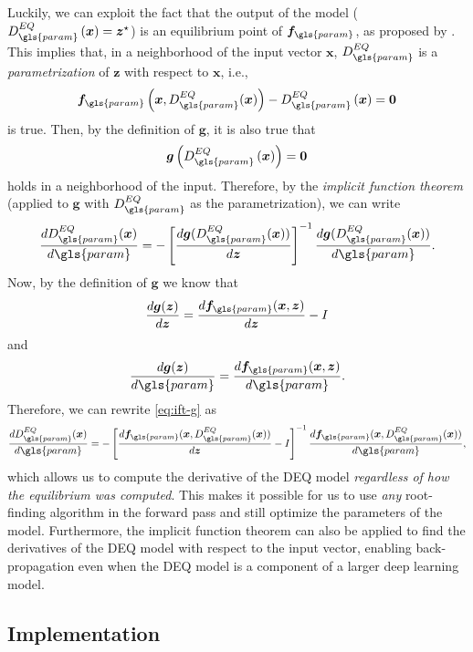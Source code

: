 Luckily, we can exploit the fact that the output of the model ($D^{EQ}_{\gls{param}}\left( \bm{x} \right) = \bm{z}^{\star}$) is an equilibrium point of $\bm{f}_{\gls{param}}$, as proposed by \textcite{Bai2019}.
This implies that, in a neighborhood of the input vector $\bm{x}$, $D^{EQ}_{\gls{param}}$ is a \emph{parametrization} of $\bm{z}$ with respect to $\bm{x}$, i.e., \[
    \bm{f}_{\gls{param}}\left( \bm{x},D^{EQ}_{\gls{param}}(\bm{x}) \right) -D^{EQ}_{\gls{param}}\left( \bm{x} \right) = \bm{0}
\] is true. Then, by the definition of $\bm{g}$, it is also true that \[
\bm{g}\left( D^{EQ}_{\gls{param}}\left( \bm{x} \right) \right) = \bm{0}
\] holds in a neighborhood of the input.
Therefore, by the \emph{implicit function theorem} (applied to $\bm{g}$ with $D^{EQ}_{\gls{param}}$ as the parametrization), we can write
\begin{equation}\label{eq:ift-g}
    \frac{d D^{EQ}_{\gls{param}}(\bm{x})}{d \gls{param}} = - \left[ \frac{d \bm{g}(D^{EQ}_{\gls{param}}(\bm{x}))}{d \bm{z}} \right]^{-1} \frac{d \bm{g}(D^{EQ}_{\gls{param}}(\bm{x}))}{d \gls{param}}
.\end{equation}
Now, by the definition of $\bm{g}$ we know that \[
    \frac{d \bm{g}(\bm{z})}{d \bm{z}} = \frac{d \bm{f}_{\gls{param}}(\bm{x},\bm{z})}{d \bm{z}} - I 
\] and \[
\frac{d \bm{g}(\bm{z})}{d \gls{param}} = \frac{d \bm{f}_{\gls{param}}(\bm{x},\bm{z})}{d \gls{param}}
.\] Therefore, we can rewrite \eqref{eq:ift-g} as
\begin{equation}\label{eq:deq-jacobian}
    \frac{d D^{EQ}_{\gls{param}}(\bm{x})}{d \gls{param}} = - \left[ \frac{d \bm{f}_{\gls{param}}(\bm{x},D^{EQ}_{\gls{param}}(\bm{x}))}{d \bm{z}} - I \right]^{-1} \frac{d \bm{f}_{\gls{param}}(\bm{x},D^{EQ}_{\gls{param}}(\bm{x}))}{d \gls{param}}
,\end{equation}
which allows us to compute the derivative of the \gls{DEQ} model \emph{regardless of how the equilibrium was computed}.
This makes it possible for us to use \emph{any} root-finding algorithm in the forward pass and still optimize the parameters of the model.
Furthermore, the implicit function theorem can also be applied to find the derivatives of the DEQ model with respect to the input vector, enabling back-propagation even when the \gls{DEQ} model is a component of a larger deep learning model.

\subsection{Implementation}

